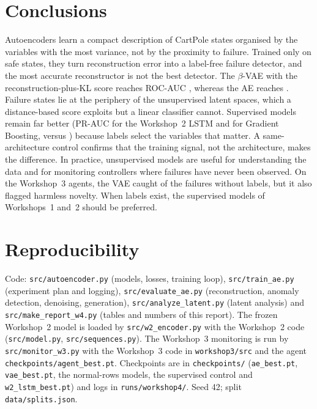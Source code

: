 \documentclass[conference]{IEEEtran}
\begin{document}
\section{Conclusions}
Autoencoders learn a compact description of CartPole states organised by the variables with
the most variance, not by the proximity to failure. Trained only on safe states, they turn
reconstruction error into a label-free failure detector, and the most accurate reconstructor
is not the best detector. The $\beta$-VAE with the reconstruction-plus-KL score reaches
ROC-AUC \vaeklAUC{}, whereas the AE reaches \aeAUC. Failure states lie at the periphery of the
unsupervised latent spaces, which a distance-based score exploits but a linear classifier
cannot. Supervised models remain far better (PR-AUC \supPR{} for the Workshop~2 LSTM and
\gbPR{} for Gradient Boosting, versus \vaeklPR) because labels select the variables that
matter. A same-architecture control confirms that the training signal, not the
architecture, makes the difference. In practice, unsupervised models are
useful for understanding the data and for monitoring controllers where failures have never
been observed. On the Workshop~3 agents, the VAE caught \monVaeCaught{} of the failures
without labels, but it also flagged harmless novelty. When labels exist, the supervised models of Workshops~1 and~2 should be
preferred.

\section*{Reproducibility}
Code: \texttt{src/autoencoder.py} (models, losses, training loop), \texttt{src/train\_ae.py}
(experiment plan and logging), \texttt{src/evaluate\_ae.py} (reconstruction, anomaly
detection, denoising, generation), \texttt{src/analyze\_latent.py} (latent analysis) and
\texttt{src/make\_report\_w4.py} (tables and numbers of this report). The frozen
Workshop~2 model is loaded by \texttt{src/w2\_encoder.py} with the Workshop~2 code
(\texttt{src/model.py}, \texttt{src/sequences.py}). The Workshop~3 monitoring is run by
\texttt{src/monitor\_w3.py} with the Workshop~3 code in \texttt{workshop3/src} and the agent
\texttt{checkpoints/agent\_best.pt}. Checkpoints are in
\texttt{checkpoints/} (\texttt{ae\_best.pt}, \texttt{vae\_best.pt}, the normal-rows
models, the supervised control and \texttt{w2\_lstm\_best.pt}) and logs in
\texttt{runs/workshop4/}. Seed 42; split \texttt{data/splits.json}.
\end{document}
